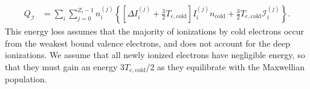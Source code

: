 \documentclass[11pt,a4paper]{article}
\newcommand{\sub}[1]{\ensuremath{_{\text{#1}}}}
\begin{document}
\begin{align}
Q_\mathcal{I} &= \sum_i \sum_{j=0}^{Z_i-1}n_i^{(j)}\left\{  \left[\Delta I_i^{(j)} + \frac{3}{2}T_{e,\text{cold}}\right]  I_i^{(j)}n\sub{cold} +  \frac{3}{2}T_{e,\text{cold}}\mathcal{I}_i^{(j)} \right\} .
\end{align}
This energy loss assumes that the majority of ionizations by cold electrons occur from the weakest bound valence electrons, and does not account for the deep ionizations. We assume that all newly ionized electrons have negligible energy, so that they must gain an energy $3T_{e,\text{cold}}/2$ as they equilibrate with the Maxwellian population.
\end{document}
